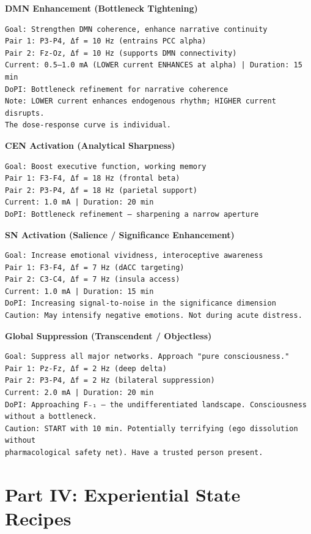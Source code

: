 \textbf{DMN Enhancement (Bottleneck Tightening)}

\begin{verbatim}
Goal: Strengthen DMN coherence, enhance narrative continuity
Pair 1: P3-P4, Δf = 10 Hz (entrains PCC alpha)
Pair 2: Fz-Oz, Δf = 10 Hz (supports DMN connectivity)
Current: 0.5–1.0 mA (LOWER current ENHANCES at alpha) | Duration: 15 min
DoPI: Bottleneck refinement for narrative coherence
Note: LOWER current enhances endogenous rhythm; HIGHER current disrupts. 
The dose-response curve is individual.
\end{verbatim}


\textbf{CEN Activation (Analytical Sharpness)}

\begin{verbatim}
Goal: Boost executive function, working memory
Pair 1: F3-F4, Δf = 18 Hz (frontal beta)
Pair 2: P3-P4, Δf = 18 Hz (parietal support)
Current: 1.0 mA | Duration: 20 min
DoPI: Bottleneck refinement — sharpening a narrow aperture
\end{verbatim}


\textbf{SN Activation (Salience / Significance Enhancement)}

\begin{verbatim}
Goal: Increase emotional vividness, interoceptive awareness
Pair 1: F3-F4, Δf = 7 Hz (dACC targeting)
Pair 2: C3-C4, Δf = 7 Hz (insula access)
Current: 1.0 mA | Duration: 15 min
DoPI: Increasing signal-to-noise in the significance dimension
Caution: May intensify negative emotions. Not during acute distress.
\end{verbatim}


\textbf{Global Suppression (Transcendent / Objectless)}

\begin{verbatim}
Goal: Suppress all major networks. Approach "pure consciousness."
Pair 1: Pz-Fz, Δf = 2 Hz (deep delta)
Pair 2: P3-P4, Δf = 2 Hz (bilateral suppression)
Current: 2.0 mA | Duration: 20 min
DoPI: Approaching F₋₁ — the undifferentiated landscape. Consciousness without a bottleneck.
Caution: START with 10 min. Potentially terrifying (ego dissolution without 
pharmacological safety net). Have a trusted person present.
\end{verbatim}


\bigskip\noindent\makebox[\textwidth]{\color{rulegray}\rule{5cm}{0.3pt}}\bigskip


\section*{Part IV: Experiential State Recipes}


